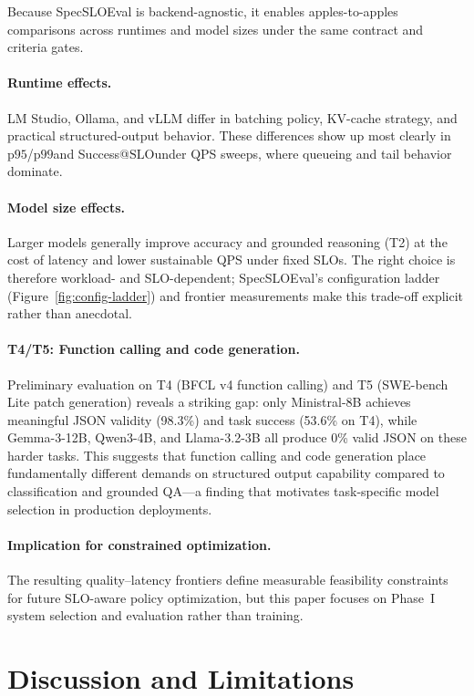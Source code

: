 \documentclass[11pt]{article}
\newcommand{\pninetyfive}{\ensuremath{\mathrm{p95}}}
\newcommand{\pninetynine}{\ensuremath{\mathrm{p99}}}
\newcommand{\slo}{\ensuremath{\mathrm{SLO}}}
\begin{document}
Because SpecSLOEval is backend-agnostic, it enables apples-to-apples comparisons across runtimes and model sizes under the same contract and criteria gates.

\paragraph{Runtime effects.}
LM Studio, Ollama, and vLLM differ in batching policy, KV-cache strategy, and practical structured-output behavior.
These differences show up most clearly in \pninetyfive/\pninetynine and Success@\slo under QPS sweeps, where queueing and tail behavior dominate.

\paragraph{Model size effects.}
Larger models generally improve accuracy and grounded reasoning (T2) at the cost of latency and lower sustainable QPS under fixed SLOs.
The right choice is therefore workload- and SLO-dependent; SpecSLOEval's configuration ladder (Figure~\ref{fig:config-ladder}) and frontier measurements make this trade-off explicit rather than anecdotal.

\paragraph{T4/T5: Function calling and code generation.}
Preliminary evaluation on T4 (BFCL v4 function calling) and T5 (SWE-bench Lite patch generation) reveals a striking gap: only Ministral-8B achieves meaningful JSON validity (98.3\%) and task success (53.6\% on T4), while Gemma-3-12B, Qwen3-4B, and Llama-3.2-3B all produce 0\% valid JSON on these harder tasks.
This suggests that function calling and code generation place fundamentally different demands on structured output capability compared to classification and grounded QA---a finding that motivates task-specific model selection in production deployments.

\paragraph{Implication for constrained optimization.}
The resulting quality--latency frontiers define measurable feasibility constraints for future SLO-aware policy optimization, but this paper focuses on Phase~I system selection and evaluation rather than training.

\section{Discussion and Limitations}
\label{sec:discussion}
\end{document}
